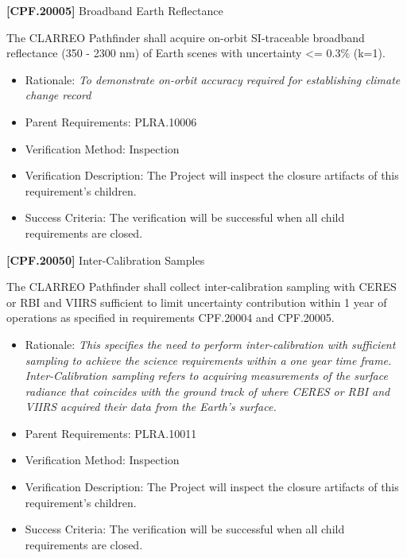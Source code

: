 \documentclass[12pt,oneside,oldfontcommands]{memoir}
\begin{document}
\textbf{[CPF.20005]} Broadband Earth Reflectance

The \gls{CLARREO} Pathfinder shall acquire on-orbit \gls{SI}-traceable broadband reflectance (350 - 2300 nm) of Earth scenes with uncertainty <= 0.3\% (k=1).

\begin{itemize}
\item{} Rationale: \emph{To demonstrate on-orbit accuracy required for establishing climate change record}

\item{} Parent Requirements: PLRA.10006

\item{} Verification Method: Inspection

\item{} Verification Description: The Project will inspect the closure artifacts of this requirement's children.

\item{} Success Criteria: The verification will be successful when all child requirements are closed.

\end{itemize}

\textbf{[CPF.20050]} Inter-Calibration Samples

The \gls{CLARREO} Pathfinder shall \gls{collect} inter-calibration sampling with \gls{CERES} or \gls{RBI} and \gls{VIIRS} sufficient to limit uncertainty contribution within 1 year of operations as specified in requirements \gls{CPF}.20004 and \gls{CPF}.20005.

\begin{itemize}
\item{} Rationale: \emph{This specifies the need to perform inter-calibration with sufficient sampling to achieve the science requirements within a one year time frame. Inter-Calibration sampling refers to acquiring measurements of the surface radiance that coincides with the ground track of where CERES or RBI and VIIRS acquired their data from the Earth's surface.}

\item{} Parent Requirements: PLRA.10011

\item{} Verification Method: Inspection

\item{} Verification Description: The Project will inspect the closure artifacts of this requirement's children.

\item{} Success Criteria: The verification will be successful when all child requirements are closed.

\end{itemize}
\end{document}
